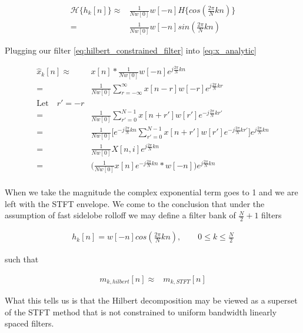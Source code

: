 \documentclass [11pt, proquest,oneside] {ganter_thesis}[2015/03/03]
\begin{document}
\begin{align}
\mathcal{H}\{h_k[n]\} \approx& \frac{1}{Nw[0]}w[-n] H\{cos(\frac{2\pi}{N}kn)\} \nonumber \\
=& \frac{1}{Nw[0]}w[-n]sin(\frac{2\pi}{N}kn)
\end{align}


Plugging our filter \ref{eq:hilbert_constrained_filter} into \ref{eq:x_analytic}

\begin{align}
\widehat{x}_k[n] \approx& x[n] * \frac{1}{Nw[0]}w[-n]e^{j\frac{2\pi}{N}kn} \nonumber \\
=& \frac{1}{Nw[0]}\sum\limits_{r=-\infty}^{\infty}x[n - r] w[-r] e^{j\frac{2\pi}{N}kr} \nonumber \\
\textrm{Let} \quad r' = -r \nonumber \\
=& \frac{1}{Nw[0]}\sum\limits_{r'=0}^{N-1} x[n + r'] w[r'] e^{-j\frac{2\pi}{N}kr'} \nonumber \\
=& \frac{1}{Nw[0]}\bigg[e^{-j\frac{2\pi}{N}kn} \sum\limits_{r'=0}^{N-1} x[n + r'] w[r'] e^{-j\frac{2\pi}{N}kr'}\bigg]e^{j\frac{2\pi}{N}kn} \nonumber \\
=& \frac{1}{Nw[0]}X[n,i]e^{j\frac{2\pi}{N}kn} \nonumber \\
=& \Bigg( \frac{1}{Nw[0]}  x[n] e^{-j\frac{2\pi}{N}kn} * w[-n] \Bigg) e^{j\frac{2\pi}{N}kn} \\
\end{align}

When we take the magnitude the complex exponential term goes to 1 and we are left with the STFT envelope.  We come to the conclusion that under the assumption of fast sidelobe rolloff we may define a filter bank of $\frac{N}{2} + 1$ filters

\begin{align}
h_k[n] = w[-n]cos(\frac{2\pi}{N}kn), \qquad 0 \leq k \leq \frac{N}{2}
\end{align}

such that

\begin{align}
m_{k,hilbert}[n] \approx& m_{k,STFT}[n]
\end{align}

What this tells us is that the Hilbert decomposition may be viewed as a superset of the STFT method that is not constrained to uniform bandwidth linearly spaced filters.
\end{document}

